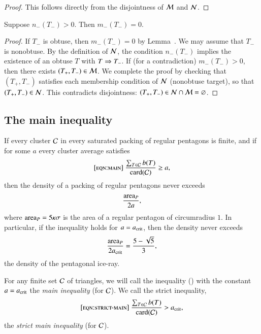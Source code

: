 \begin{proof} 
  This follows directly from the disjointness of $\mathcal M$ and $\mathcal N$.
\end{proof}

\begin{lemma}  
  Suppose $n_-(T_-)>0$.  Then $m_-(T_-)=0$.
\end{lemma}

\begin{proof}
  If $T_-$ is obtuse, then $m_-(T_-)=0$ by Lemma~.
  We may assume that $T_-$ is nonobtuse.  By the definition of $\mathcal N$,
  the condition $n_-(T_-)$ implies the existence of an obtuse $T$ with
  $T\Rightarrow T_-$.  If (for a contradiction) $m_-(T_-)>0$, then there
  exists $(T_+,T_-)\in\mathcal M$.  We complete the proof by checking that
  $(T_+,T_-)$ satisfies each membership condition of $\mathcal N$ (nonobtuse
  target), so that $(T_+,T_-)\in\mathcal N$.  This contradicts disjointness:
  $(T_+,T_-)\in \mathcal N\cap\mathcal M = \varnothing$.
\end{proof}



\subsection{The main inequality}

\begin{lemma}  
If  every cluster $\mathcal C$ in every saturated packing of regular
  pentagons is finite, and if for some $a$ every cluster average
  satisfies
\begin{equation}\libel{eqn:main}
\frac{\sum_{T\in \C} b(T)}{\card(\C)} \ge a,
\end{equation}
then the density of a packing of regular pentagons never exceeds 
\[
\frac{{\operatorname{area}}_P} {2 a},
\]
where ${\operatorname{area}}_P = 5\kappa\sigma$ is the area of a regular pentagon of
circumradius $1$.  In particular, if the inequality holds for $a=a_\text{crit}$,
then the density never exceeds
\[
\frac{{\operatorname{area}}_P}{2 a_\text{crit}} = \frac{5 - \sqrt{5}}{3},
\] %
the density of the pentagonal ice-ray.
\end{lemma}

For any finite set $\mathcal C$ of triangles, we will call the inequality
() with the constant $a=a_\text{crit}$ the {\it main inequality}
(for $\mathcal C$).  We call the strict inequality,
\begin{equation}\libel{eqn:strict-main}
\frac{\sum_{T\in \C} b(T)}{\card(\C)} > \acrit,
\end{equation}
the {\it strict main inequality} (for $\mathcal C$).


